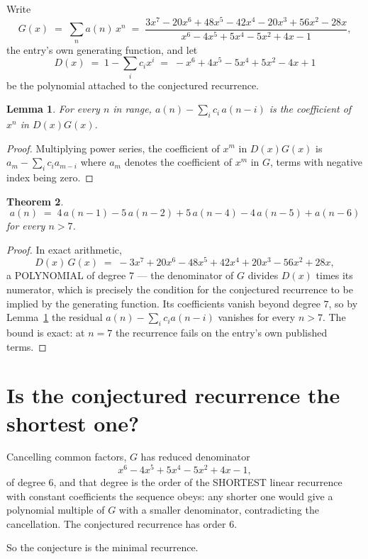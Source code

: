 \documentclass[11pt,a4paper]{article}
\theoremstyle{plain}
\newtheorem{theorem}{Theorem}
\newtheorem{lemma}[theorem]{Lemma}
\theoremstyle{definition}
\begin{document}
Write
\[
G(x)\;=\;\sum_{n}a(n)\,x^{n}\;=\;\frac{3 x^{7} - 20 x^{6} + 48 x^{5} - 42 x^{4} - 20 x^{3} + 56 x^{2} - 28 x}{x^{6} - 4 x^{5} + 5 x^{4} - 5 x^{2} + 4 x - 1},
\]
the entry's own generating function, and let
\[
D(x)\;=\;1-\sum_i c_i x^{i}\;=\;- x^{6} + 4 x^{5} - 5 x^{4} + 5 x^{2} - 4 x + 1
\]
be the polynomial attached to the conjectured recurrence.

\begin{lemma}\label{lem:key}
For every $n$ in range, $a(n)-\sum_i c_i\,a(n-i)$ is the coefficient of $x^{n}$ in
$D(x)G(x)$.
\end{lemma}

\begin{proof}
Multiplying power series, the coefficient of $x^{m}$ in $D(x)G(x)$ is
$a_m-\sum_i c_i a_{m-i}$ where $a_m$ denotes the coefficient of $x^{m}$ in $G$, terms with
negative index being zero.
\end{proof}

\begin{theorem}
\[
a(n)\;=\;4\,a(n-1) - 5\,a(n-2) + 5\,a(n-4) - 4\,a(n-5) + a(n-6)
\]
for every $n>7$.
\end{theorem}

\begin{proof}
In exact arithmetic,
\[
D(x)\,G(x)\;=\;- 3 x^{7} + 20 x^{6} - 48 x^{5} + 42 x^{4} + 20 x^{3} - 56 x^{2} + 28 x,
\]
a POLYNOMIAL of degree $7$ --- the denominator of $G$ divides $D(x)$ times its numerator,
which is precisely the condition for the conjectured recurrence to be implied by the
generating function. Its coefficients vanish beyond degree $7$, so by
Lemma~\ref{lem:key} the residual $a(n)-\sum_ic_ia(n-i)$ vanishes for every
$n>7$. The bound is exact: at $n=7$ the recurrence fails on the entry's own published terms.
\end{proof}

\section{Is the conjectured recurrence the shortest one?}

Cancelling common factors, $G$ has reduced denominator
\[
x^{6} - 4 x^{5} + 5 x^{4} - 5 x^{2} + 4 x - 1,
\]
of degree $6$, and that degree is the order of the SHORTEST linear recurrence with
constant coefficients the sequence obeys: any shorter one would give a polynomial multiple of
$G$ with a smaller denominator, contradicting the cancellation. The conjectured recurrence has
order $6$.

So the conjecture is the minimal recurrence.
\end{document}
